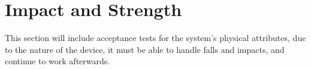     \section{Impact and Strength}
    \label{sec:test_strength}

        This section will include acceptance tests for the system's physical attributes, due to the nature of the device, it must be able to handle falls and impacts, and continue to work afterwards.

        \vspace{1em}
        

        \vspace{4em}
        


